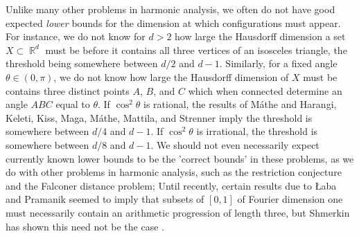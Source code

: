 \documentclass[11pt]{article}
\DeclareMathOperator{\QQ}{\mathbb{Q}}
\DeclareMathOperator{\RR}{\mathbb{R}}
\begin{document}
Unlike many other problems in harmonic analysis, we often do not have good expected \emph{lower} bounds for the dimension at which configurations must appear.
%
For instance, we do not know for $d > 2$ how large the Hausdorff dimension a set $X \subset \RR^d$ must be before it contains all three vertices of an isosceles triangle, the threshold being somewhere between $d/2$ and $d-1$. Similarly, for a fixed angle $\theta \in (0,\pi)$, we do not know how large the Hausdorff dimension of $X$ must be contains three distinct points $A$, $B$, and $C$ which when connected determine an angle $ABC$ equal to $\theta$. If $\cos^2 \theta$ is rational, the results of M\'{a}the \cite{Mathe} and Harangi, Keleti, Kiss, Maga, M\'{a}the, Mattila, and Strenner \cite{Harangi} imply the threshold is somewhere between $d/4$  and $d-1$. If $\cos^2 \theta$ is irrational, the threshold is somewhere between $d/8$ and $d-1$. 
We should not even necessarily expect currently known lower bounds to be the 'correct bounds' in these problems, as we do with other problems in harmonic analysis, such as the restriction conjecture and the Falconer distance problem; Until recently, certain results due to {\L}aba and Pramanik \cite{LabaPramanik} seemed to imply that subsets of $[0,1]$ of Fourier dimension one must necessarily contain an arithmetic progression of length three, but Shmerkin has shown this need not be the case \cite{Shmerkin}.
\end{document}
